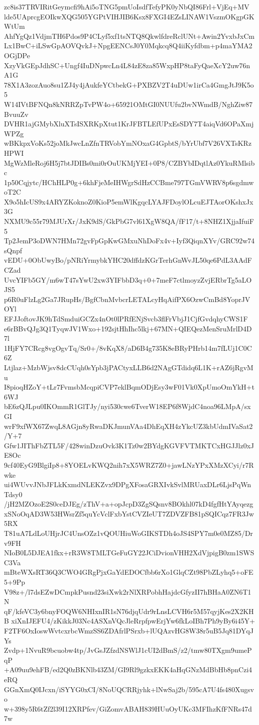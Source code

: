 zc8is37TRVIRitGeymcfi9hAi5oTNG5pmUoIsdfTefyPK0yNbQI86Frl+VjEq+MV
lde5UAprcgEOIkwXQG505YGPtVIHJIB6Ksx8FXGI4EZsLINAW1VszmOKgpGKWtUm
AhfYgQz1VdjmTH6Pdos9P4CLyf5xf1tsNTQ8QkwlfdreRclUNt+Awin2YvxbJxCm
Lx1BwC+iLSwGpAOVQvkJ+NpgEENCsJ0Y0Mqkcq8Q4iiKyfdbm+p4maYMA2OGjDPe
XzyVkGEpJdhSC+Ungf4IuDNpwcLn4L84zE8za85WxpHP8taFyQaeXcY2uw76nA1G
78X1A3zozAuo8su1ZJ4y4jAukfeYCtbekG+PXBZV2T4uDUw1irCa4GmgJtJ9K5o5
W14IVtBFNQn8kNRRZpTvPW4o+65921OMtGI0NUUfu2bvNWmdB/NghZiw87BvuuZv
DVHR1ajGMybXluXTsISXRKpXtut1KrJFBTLEfUPxEsSDY7T4aiqVd6OPaXmjWPZg
wBKkpxVoKs52joMkJwcLnZfnTRVobYmNOxaG4GpbtS/bYrUbf7V26VXTsKRzHPWI
MgWzMleRoj6H5j7btJDIBs0mi0rOuUKMjYEI+0P8/CZBYbIDqtlAz0YkuRMlsibc
1p50Cqjytc/HChHLP0g+6khFjeMeIHWgrSdHzCCBme797TGmVWRV8p6sgdmwoT2C
X9o5hIcUS9x4ARYZKoknoZ0KioP5emWlKgqcLYAJFDoylOLcuEJTAorOKshxJx3G
NXMU9c55r79MJUrXr/JxK9dS/GkPbG7vl61XgW8QA/fF17/t+8NHZ1XjjaIfuiF5
Tp2JemP3oDWN7HMn72gvFpGpKwGMxuNhDoFx4v+Iyf3QiqnXYv/GRC92w74sQnpf
vEDU+0ObUwyBo/pNRiYrmybkYHC20dffdzKGrTerhGnWvJL50qe6PdL3AAdFCZad
UvcYIFb5GY/m6wT47sYwU2xw3YIFbbD3q+0+7meF7ctlmoyzZvjERbrTg5aLOJS5
p6R0uFlzLg2Ga7JRupHs/BgfCbnMvbcrLETALcyHqAifPX6OzwCmBd8YoprJVOYl
EFJJoftovJK9hTdSmduiGCZx4nOt0lPRfENjSvcb3flFrVbjJ1CjfGvdqhyCWS1F
e6rBBvQJg3Q1TyqwJV1Wxo+192sjtHhIhc5lkj+67MN+QIEQezMenSruMrlD4D7l
1HjFY7CRcg8vgOgvTq/Sr0+/8vKqX8/aD6B4g735K8eBRyPHrb14m7fLUj1C0C6Z
Ltjlaz+MzbWjsv8dcCUqh0sYpb3jPACtyxLLB6d2NAgGTdidq6L1K+rAZ6jRgvMu
I8pioqHZoY+tLr7FvmsbMcqpiCVP7eklBqmODjEsy3wF01Vk0XpUmoOmYkH+t6WJ
bE6zQJLpu0IKOmmR1GlTJy/nyi530cwe6TverW18EP6f8WjdC4noa96LMpA/sxGI
wrF9xfWX67ZwqL8AGjn8yRwaDKJmunVAa4DhEqXH4zYkcUZ3kbUdmIVaSat2/Y+7
Gfw1JIThFbZTL5F/428winDzuOvk3K1Tz0w2BYdgKGVFVTMKTCxHGJJlz0xJE8Oc
9cf40EyG9BlgiIp8+8YOELvKWQ2nih7xX5WRZ7Z0+jawLNzYPxXMzXCyi/r7Rwke
ui4WUvvJNbJFLkKxmdNLEKZvx9DPgXFosaGRXIvkSvlMRUaxDLr6LjsPqWnTdsy0
/jH2MZOzoE2S0ceDJEg/zThV+a+opJcpD3ZgSQsnv8BOkhl07kD4fgfHtYAyqezg
xSNoOqAD3W53HWsrZf5quYcVclFxbYstCVZIeUT7ZDVZFB81pSQICqz7FR3Jw5RX
T81uA7LdLoUHjrJC4UnsOZz1vQOUHiuWoGIKSTDh4oJS4SPY7m0e0MZ85/Drv9FH
NIoB0L5DJEA1fkx+rR3W8TMLTGeFuGY22JCiDvionVHH2XdVjpigB0zm1SWSC3Va
mBteWXsRT36Q3CWO4GRgPjxGaYdEDOCfbb6rXo1GlqCZt98PbZLyhq5+oFE5+9Pp
V98z+/l7dsEZwDCmpkPusnd23siXwk2rNlXRPobhHajdcGfyzII7hBHaA0ZN6T1N
qF/kfeVC3y6bnyFOQW6NHIxnIR1sN76djqUdr9rLnsLCVH6r5M57qyjKes2X2KHB
xiXnIJEFU4/zKikkJ03Nc4ASXnVQcJleRrpfpwErjYw6fkLoIBh7Ph9yBy6i45Y+
F2TF6OxIoswWvtcxrbcWmzSS6ZDAfrlPSrxb+lUQAzvHG8W38r5uB5Jq81DYqJYs
Zvdp+1NvuR9bcuobw4tp/JvGsJZfzdNSWlJ1cUI2dBmS/z2/tmw80TXgm9umePqP
+A09uu9ehFB/ed2Q0zBKNlb43ZM/GI9Rl9gzkxEKK4aHqGNzMdBbHb8pnCzi4eRQ
GGnXmQ0IJcxn/iSYYG0xCI/8NoUQCRRjyhk+lNwSaj2b/595cA7U4fs480Xugsvo
w+398y5R6tZf2l39I12XRPfev/GiZomvABAH839HUuOyUKc3MFIhzKfFNRs47d7w
